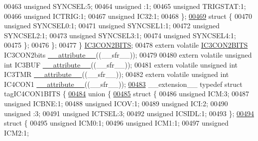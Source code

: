 \begin{DoxyCode}
00463       \textcolor{keywordtype}{unsigned} SYNCSEL:5;
00464       \textcolor{keywordtype}{unsigned} :1;
00465       \textcolor{keywordtype}{unsigned} TRIGSTAT:1;
00466       \textcolor{keywordtype}{unsigned} ICTRIG:1;
00467       \textcolor{keywordtype}{unsigned} IC32:1;
00468     \};
\hypertarget{a00009_source_l00469}{}\hyperlink{a00009}{00469}     \textcolor{keyword}{struct }\{
00470       \textcolor{keywordtype}{unsigned} SYNCSEL0:1;
00471       \textcolor{keywordtype}{unsigned} SYNCSEL1:1;
00472       \textcolor{keywordtype}{unsigned} SYNCSEL2:1;
00473       \textcolor{keywordtype}{unsigned} SYNCSEL3:1;
00474       \textcolor{keywordtype}{unsigned} SYNCSEL4:1;
00475     \};
00476   \};
00477 \} \hyperlink{a00008_d0/d29/a00470}{IC3CON2BITS};
00478 \textcolor{keyword}{extern} \textcolor{keyword}{volatile} \hyperlink{a00008_d0/d29/a00470}{IC3CON2BITS} IC3CON2bits \hyperlink{a00009_a493c46f03454991ccc5aa7a6e1dfb2a7}{\_\_attribute\_\_}((\_\_sfr\_\_));
00479 
00480 \textcolor{keyword}{extern} \textcolor{keyword}{volatile} \textcolor{keywordtype}{unsigned} \textcolor{keywordtype}{int}  IC3BUF \hyperlink{a00009_a493c46f03454991ccc5aa7a6e1dfb2a7}{\_\_attribute\_\_}((\_\_sfr\_\_));
00481 \textcolor{keyword}{extern} \textcolor{keyword}{volatile} \textcolor{keywordtype}{unsigned} \textcolor{keywordtype}{int}  IC3TMR \hyperlink{a00009_a493c46f03454991ccc5aa7a6e1dfb2a7}{\_\_attribute\_\_}((\_\_sfr\_\_));
00482 \textcolor{keyword}{extern} \textcolor{keyword}{volatile} \textcolor{keywordtype}{unsigned} \textcolor{keywordtype}{int}  IC4CON1 \hyperlink{a00009_a493c46f03454991ccc5aa7a6e1dfb2a7}{\_\_attribute\_\_}((\_\_sfr\_\_));
\hypertarget{a00009_source_l00483}{}\hyperlink{a00008}{00483} \_\_extension\_\_ \textcolor{keyword}{typedef} \textcolor{keyword}{struct }tagIC4CON1BITS \{
\hypertarget{a00009_source_l00484}{}\hyperlink{a00009}{00484}   \textcolor{keyword}{union }\{
\hypertarget{a00009_source_l00485}{}\hyperlink{a00009}{00485}     \textcolor{keyword}{struct }\{
00486       \textcolor{keywordtype}{unsigned} ICM:3;
00487       \textcolor{keywordtype}{unsigned} ICBNE:1;
00488       \textcolor{keywordtype}{unsigned} ICOV:1;
00489       \textcolor{keywordtype}{unsigned} ICI:2;
00490       \textcolor{keywordtype}{unsigned} :3;
00491       \textcolor{keywordtype}{unsigned} ICTSEL:3;
00492       \textcolor{keywordtype}{unsigned} ICSIDL:1;
00493     \};
\hypertarget{a00009_source_l00494}{}\hyperlink{a00009}{00494}     \textcolor{keyword}{struct }\{
00495       \textcolor{keywordtype}{unsigned} ICM0:1;
00496       \textcolor{keywordtype}{unsigned} ICM1:1;
00497       \textcolor{keywordtype}{unsigned} ICM2:1;

\end{DoxyCode}
